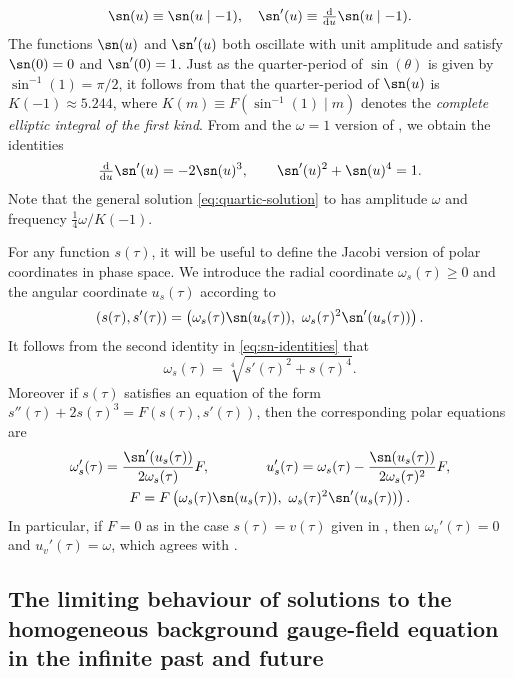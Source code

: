 \[
\sn(u)\equiv\sn(u\mid-1),\quad\sn'(u)\equiv\tfrac{\mathrm{d}}{\mathrm{d}u}\sn(u\mid-1).
\]
 The functions $\sn(u)$ and $\sn'(u)$ both oscillate with unit amplitude and satisfy $\sn(0)=0$ and $\sn'(0)=1$. Just as the quarter-period of $\sin(\theta)$ is given by $\sin^{-1}(1)=\pi/2$, it follows from  that the quarter-period of $\sn(u)$ is $K(-1)\approx5.244$, where $K(m)\equiv F(\sin^{-1}(1)\mid m)$ denotes the \emph{complete elliptic integral of the first kind}. From  and the $\omega=1$ version of , we obtain the identities
\begin{equation}
\tfrac{\mathrm{d}}{\mathrm{d}u}\sn'(u)=-2\sn(u)^{3},\qquad\sn'(u)^{2}+\sn(u)^{4}=1.\label{eq:sn-identities}
\end{equation}
 Note that the general solution \eqref{eq:quartic-solution} to  has amplitude $\omega$ and frequency $\tfrac{1}{4}\omega/K(-1)$. 

For any function $s(\tau)$, it will be useful to define the Jacobi version of polar coordinates in phase space. We introduce the radial coordinate $\omega_{s}(\tau)\geq0$ and the angular coordinate $u_{s}(\tau)$ according to 
\begin{equation}
\left(s(\tau),s'(\tau)\right)=\left(\omega_{s}(\tau)\sn(u_{s}(\tau)),\ \omega_{s}(\tau)^{2}\sn'(u_{s}(\tau))\right).\label{eq:polar-def}
\end{equation}
 It follows from the second identity in \eqref{eq:sn-identities} that 
\[
\omega_{s}(\tau)=\sqrt[4]{s'(\tau)^{2}+s(\tau)^{4}}.
\]
 Moreover if $s(\tau)$ satisfies an equation of the form $s''(\tau)+2s(\tau)^{3}=F(s(\tau),s'(\tau))$, then the corresponding polar equations are 
\begin{align}
\omega_{s}'(\tau)  =\frac{\sn'(u_{s}(\tau))}{2\omega_{s}(\tau)}F,  \qquad \qquad u_{s}'(\tau)  =\omega_{s}(\tau)-\frac{\sn(u_{s}(\tau))}{2\omega_{s}(\tau)^{2}}F, \nonumber \\
F  =F\left(\omega_{s}(\tau)\sn(u_{s}(\tau)),\ \omega_{s}(\tau)^{2}\sn'(u_{s}(\tau))\right).  \hspace{1.cm}  \label{eq:Jacobi-polar}
\end{align}
 In particular, if $F=0$ as in the case $s(\tau)=v(\tau)$ given in , then $\omega_{v}'(\tau)=0$ and $u_{v}'(\tau)=\omega$, which agrees with . 

\subsection{\label{app:pf-bg-future}The limiting behaviour of solutions to the homogeneous background gauge-field equation in the infinite past and future}

